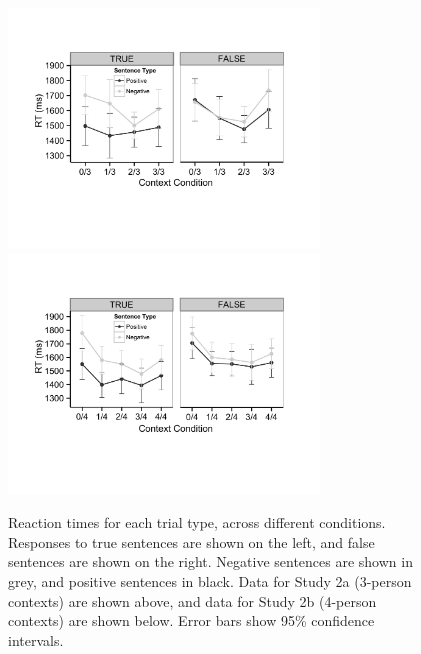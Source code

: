 \documentclass[10pt,letterpaper]{article}
\begin{document}

\begin{figure}
\begin{center} 
\includegraphics[width=3.25in]{figures/study2a_linegraph.pdf}
\includegraphics[width=3.25in]{figures/study2b_linegraph.pdf}
\caption{\label{fig:e2line} Reaction times for each trial type, across different conditions. Responses to true sentences are shown on the left, and false sentences are shown on the right.  Negative sentences are shown in grey, and positive sentences in black.  Data for Study 2a (3-person contexts) are shown above, and data for Study 2b (4-person contexts) are shown below.  Error bars show 95\% confidence intervals.  }
\end{center} 
\end{figure}
\end{document}
